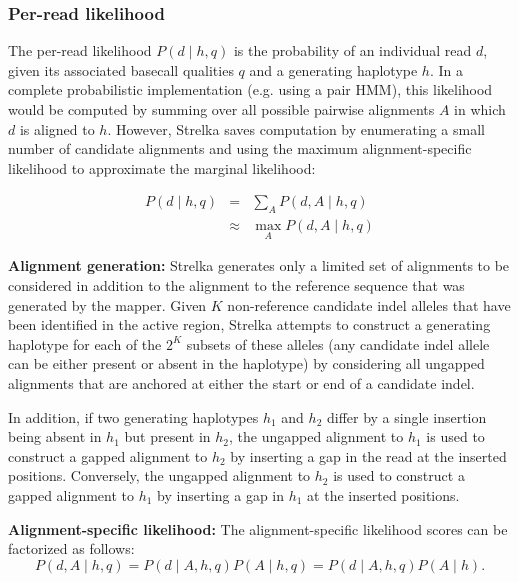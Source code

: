 \documentclass{article}
\begin{document}
\subsubsection{Per-read likelihood}
\label{sec:PerReadLikelihood}

The per-read likelihood $P(d \mid h,q)$ is the probability of an individual read $d$, given its associated basecall qualities $q$ and a generating haplotype $h$. In a complete probabilistic implementation (e.g. using a pair HMM), this likelihood would be computed by summing over all possible pairwise alignments $A$ in which $d$ is aligned to $h$. However, Strelka saves computation by enumerating a small number of candidate alignments and using the maximum alignment-specific likelihood to approximate the marginal likelihood:

\begin{eqnarray*}
\label{eq:read_lik}
P(d \mid h,q) & = & \sum_A P(d,A \mid h,q)\\
& \approx & \max_A P(d,A \mid h,q)
\end{eqnarray*}

{\bf Alignment generation:}
Strelka generates only a limited set of alignments to be considered in addition to the alignment to the reference sequence that was generated by the mapper. Given $K$ non-reference candidate indel alleles that have been identified in the active region, Strelka attempts to construct a generating haplotype for each of the $2^K$ subsets of these alleles (any candidate indel allele can be either present or absent in the haplotype) by considering all ungapped alignments that are anchored at either the start or end of a candidate indel.

In addition, if two generating haplotypes $h_1$ and $h_2$ differ by a single insertion being absent in $h_1$ but present in $h_2$, the ungapped alignment to $h_1$ is used to construct a gapped alignment to $h_2$ by inserting a gap in the read at the inserted positions. Conversely, the ungapped alignment to $h_2$ is used to construct a gapped alignment to $h_1$ by inserting a gap in $h_1$ at the inserted positions.

{\bf Alignment-specific likelihood:}
The alignment-specific likelihood scores can be factorized as follows:
\begin{equation*}
\label{eq:al_lik}
P(d,A \mid h,q) = P(d \mid A,h,q)P(A \mid h,q) = P(d \mid A,h,q)P(A \mid h).
\end{equation*}
\end{document}
